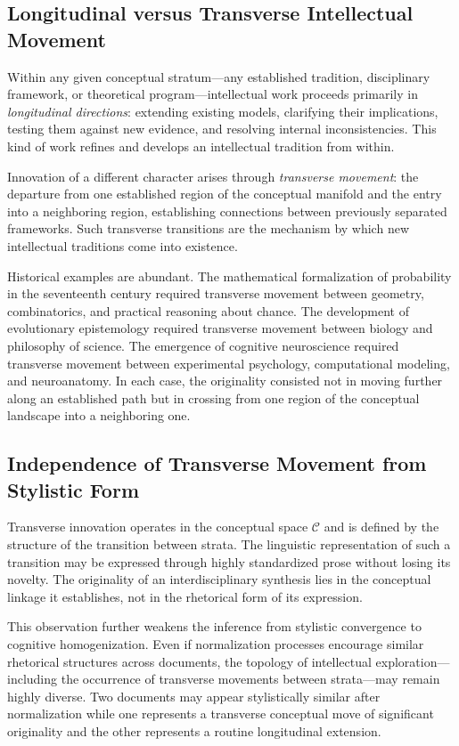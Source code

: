 \documentclass[12pt,a4paper]{article}
\theoremstyle{definition}
\theoremstyle{plain}
\theoremstyle{remark}
\newcommand{\calC}{\mathcal{C}}
\begin{document}
\subsection{Longitudinal versus Transverse Intellectual Movement}

Within any given conceptual stratum---any established tradition, disciplinary framework, or
theoretical program---intellectual work proceeds primarily in \emph{longitudinal directions}:
extending existing models, clarifying their implications, testing them against new evidence,
and resolving internal inconsistencies. This kind of work refines and develops an
intellectual tradition from within.

Innovation of a different character arises through \emph{transverse movement}: the departure
from one established region of the conceptual manifold and the entry into a neighboring
region, establishing connections between previously separated frameworks. Such transverse
transitions are the mechanism by which new intellectual traditions come into existence.

Historical examples are abundant. The mathematical formalization of probability in the
seventeenth century required transverse movement between geometry, combinatorics, and
practical reasoning about chance. The development of evolutionary epistemology required
transverse movement between biology and philosophy of science. The emergence of cognitive
neuroscience required transverse movement between experimental psychology, computational
modeling, and neuroanatomy. In each case, the originality consisted not in moving further
along an established path but in crossing from one region of the conceptual landscape into
a neighboring one.

\subsection{Independence of Transverse Movement from Stylistic Form}

Transverse innovation operates in the conceptual space $\calC$ and is defined by the
structure of the transition between strata. The linguistic representation of such a transition
may be expressed through highly standardized prose without losing its novelty. The
originality of an interdisciplinary synthesis lies in the conceptual linkage it establishes,
not in the rhetorical form of its expression.

This observation further weakens the inference from stylistic convergence to cognitive
homogenization. Even if normalization processes encourage similar rhetorical structures across
documents, the topology of intellectual exploration---including the occurrence of transverse
movements between strata---may remain highly diverse. Two documents may appear stylistically
similar after normalization while one represents a transverse conceptual move of significant
originality and the other represents a routine longitudinal extension.
\end{document}
